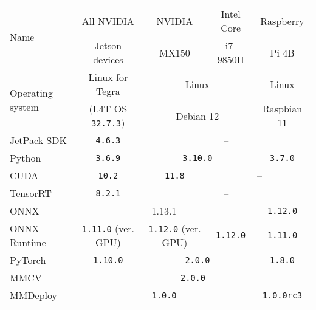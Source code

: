 \begin{table}[t]
    \centering
    \small
    \begin{threeparttable}
        \begin{tabular}{|l|c|c|c|c|}
            \hline
            \multirow{2}{*}{Name} & All NVIDIA     & NVIDIA & Intel Core  & Raspberry \\
                                  & Jetson devices & MX150  & i7-9850H    & Pi 4B \\
            \hline
            \multirow{2}{*}{Operating system} & Linux for Tegra             & \multicolumn{2}{c|}{Linux}     & Linux   \\
                                            & (L4T OS \texttt{32.7.3}) & \multicolumn{2}{c|}{Debian 12} & Raspbian 11   \\
            \hline
            JetPack SDK      & \texttt{4.6.3}                     & \multicolumn{3}{c|}{--}  \\
            \hline
            Python           & \texttt{3.6.9}                     & \multicolumn{2}{c|}{\texttt{3.10.0}} & \texttt{3.7.0} \\
            \hline
            CUDA             & \texttt{10.2}                      & \texttt{11.8} & \multicolumn{2}{c|}{--} \\
            \hline
            TensorRT         & \texttt{8.2.1} & \multicolumn{3}{c|}{--}             \\
            \hline
            ONNX             & \multicolumn{3}{c|}{1.13.1} & \texttt{1.12.0}             \\
            \hline
            ONNX Runtime     & \texttt{1.11.0} (ver. GPU) & \texttt{1.12.0} (ver. GPU) & \texttt{1.12.0} & \texttt{1.11.0}            \\
            \hline
            PyTorch          & \texttt{1.10.0} & \multicolumn{2}{c|}{\texttt{2.0.0}} & \texttt{1.8.0} \\
            \hline
            MMCV             & \multicolumn{4}{c|}{\texttt{2.0.0}} \\
            \hline
            MMDeploy         & \multicolumn{3}{c|}{\texttt{1.0.0}} & \texttt{1.0.0rc3} \\

\end{tabular}
\end{threeparttable}
\end{table}
